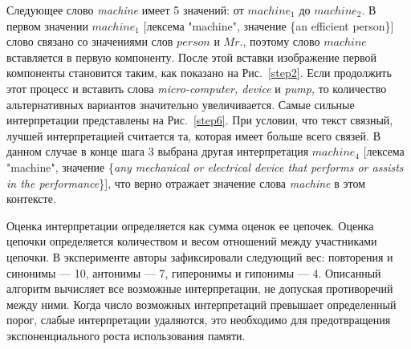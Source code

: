 \documentclass{article}
\begin{document}
\begin{articletext}
Следующее слово \textit{machine} имеет 5 значений: от $machine_1$  до $machine_2$. В первом значении $machine_1$  [лексема "machine", значение \{an efficient person\}] слово связано со значениями слов $person$ и $Mr.$, поэтому слово $machine$  вставляется в первую компоненту. После этой вставки изображение первой компоненты становится таким, как показано на Рис.~\ref{step2}. Если продолжить этот процесс и вставить слова \textit{micro-computer, device} и \textit{pump,} то количество альтернативных вариантов значительно увеличивается. Самые сильные интерпретации представлены на Рис.~\ref{step6}. При условии, что текст связный, лучшей интерпретацией считается та, которая имеет больше всего связей. В данном  случае в конце шага 3 выбрана другая интерпретация $machine_4$ [лексема "machine", значение \{\textit{any mechanical or electrical device that performs or assists in the performance}\}], что верно отражает значение слова \textit{machine} в этом контексте.

Оценка интерпретации определяется как сумма оценок ее цепочек. 
Оценка цепочки определяется количеством и весом отношений между участниками цепочки. 
В эксперименте авторы зафиксировали следующий вес: повторения и синонимы  --- 10, антонимы --- 7, 
гиперонимы и гипонимы --- 4. Описанный алгоритм вычисляет все возможные интерпретации, 
не допуская противоречий между ними. 
Когда число возможных интерпретаций превышает определенный порог, слабые интерпретации удаляются, 
это необходимо для предотвращения экспоненциального роста использования памяти.


\end{articletext}
\end{document}

